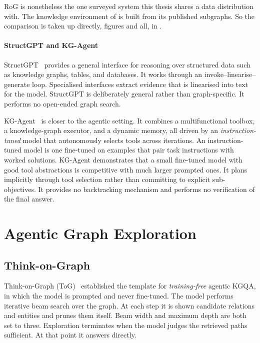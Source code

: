 RoG is nonetheless the one surveyed system this thesis shares a data
distribution with. The knowledge environment of  is built
from its published subgraphs. So the comparison is taken up directly, figures
and all, in .

\paragraph{StructGPT and KG-Agent}

StructGPT~\cite{jiang2023structgpt} provides a general interface for reasoning
over structured data such as knowledge graphs, tables, and databases. It works
through an invoke--linearise--generate loop. Specialised interfaces extract
evidence that is linearised into text for the model. StructGPT is deliberately
general rather than graph-specific. It performs no open-ended graph search.

KG-Agent~\cite{jiang2024kgagent} is closer to the agentic setting. It combines a
multifunctional toolbox, a knowledge-graph executor, and a dynamic memory, all
driven by an \emph{instruction-tuned} model that autonomously selects tools
across iterations. An instruction-tuned model is one fine-tuned on examples that
pair task instructions with worked solutions. KG-Agent demonstrates that a small
fine-tuned model with good tool abstractions is competitive with much larger
prompted ones. It plans implicitly through tool selection rather than committing
to explicit sub-objectives. It provides no backtracking mechanism and performs
no verification of the final answer.

\section{Agentic Graph Exploration}\label{sec:agentic-exploration}

\subsection{Think-on-Graph}

Think-on-Graph (ToG)~\cite{sun2024think} established the template
for \emph{training-free} agentic KGQA, in which the model
is prompted and never fine-tuned. The model performs iterative beam search over
the graph. At each step it is shown candidate relations and entities and prunes
them itself. Beam width and maximum depth are both set to three. Exploration
terminates when the model judges the retrieved paths sufficient. At that point
it answers directly.

